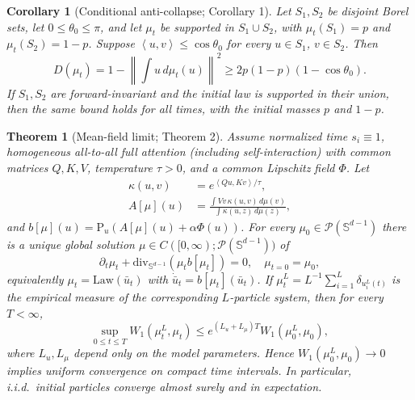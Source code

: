 \documentclass[11pt]{article}
\newtheorem{theorem}{Theorem}
\newtheorem{corollary}{Corollary}
\newcommand{\Sph}{\mathbb{S}}
\newcommand{\Prob}{\mathcal{P}}
\newcommand{\norm}[1]{\left\lVert #1 \right\rVert}
\newcommand{\ip}[2]{\left\langle #1,#2 \right\rangle}
\newcommand{\Proj}{\mathrm{P}}
\newcommand{\divS}{\mathrm{div}_{\Sph^{d-1}}}
\begin{document}
\begin{corollary}[Conditional anti-collapse; Corollary 1]\label{supp:cor:anti}
Let $S_1,S_2$ be disjoint Borel sets, let $0\le\theta_0\le\pi$, and let
$\mu_t$ be supported in $S_1\cup S_2$, with $\mu_t(S_1)=p$ and
$\mu_t(S_2)=1-p$. Suppose $\ip{u}{v}\le\cos\theta_0$ for every
$u\in S_1$, $v\in S_2$. Then
\begin{equation}
D(\mu_t)=1-\norm{\int u\,d\mu_t(u)}^2
\ge 2p(1-p)(1-\cos\theta_0).
\label{supp:eq:anti}
\end{equation}
If $S_1,S_2$ are forward-invariant and the initial law is supported in their
union, then the same bound holds for all times, with the initial masses $p$ and
$1-p$.
\end{corollary}

\begin{theorem}[Mean-field limit; Theorem 2]\label{supp:thm:mf}
Assume normalized time $s_i\equiv1$, homogeneous all-to-all full attention
(including self-interaction) with common
matrices $Q,K,V$, temperature $\tau>0$, and a common Lipschitz field $\Phi$.
Let
\begin{equation}
\begin{split}
\kappa(u,v)&=e^{\ip{Qu}{Kv}/\tau},\\
A[\mu](u)&=\frac{\int Vv\,\kappa(u,v)\,d\mu(v)}
{\int\kappa(u,z)\,d\mu(z)},
\end{split}
\end{equation}
and $b[\mu](u)=\Proj_u(A[\mu](u)+\alpha\Phi(u))$. For every
$\mu_0\in\Prob(\Sph^{d-1})$ there is a unique global solution
$\mu\in C([0,\infty);\Prob(\Sph^{d-1}))$ of
\begin{equation}
\partial_t\mu_t+\divS(\mu_t b[\mu_t])=0,
\quad \mu_{t=0}=\mu_0,
\label{supp:eq:mckean}
\end{equation}
equivalently $\mu_t=\mathrm{Law}(\bar u_t)$ with
$\dot{\bar u}_t=b[\mu_t](\bar u_t)$. If
$\mu_t^L=L^{-1}\sum_{i=1}^L\delta_{u_i^L(t)}$ is the empirical measure of the
corresponding $L$-particle system, then for every $T<\infty$,
\begin{equation}
\sup_{0\le t\le T}W_1(\mu_t^L,\mu_t)
\le e^{(L_u+L_\mu)T}W_1(\mu_0^L,\mu_0),
\label{eq:dobrushin}
\end{equation}
where $L_u,L_\mu$ depend only on the model parameters. Hence
$W_1(\mu_0^L,\mu_0)\to0$ implies uniform convergence on compact time intervals.
In particular, i.i.d.\ initial particles converge almost surely and in
expectation.
\end{theorem}
\end{document}
